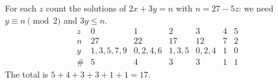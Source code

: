 For each $z$ count the solutions of $2x+3y=n$ with $n=27-5z$: we need $y\equiv n\pmod 2$ and $3y\le n$.
\[\begin{array}{c|cccccc}z&0&1&2&3&4&5\\\hline n&27&22&17&12&7&2\\ y&1,3,5,7,9&0,2,4,6&1,3,5&0,2,4&1&0\\ \#&5&4&3&3&1&1\end{array}\]
The total is $5+4+3+3+1+1=\boxed{17}$.
